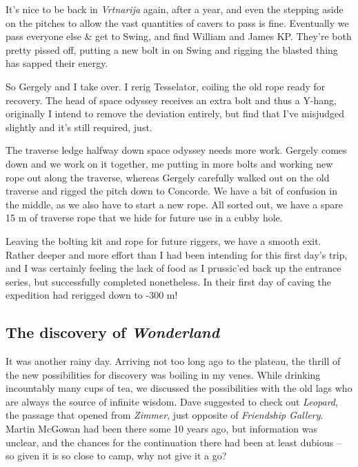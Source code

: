 It's nice to be back in \emph{Vrtnarija} again, after a year, and even
the stepping aside on the pitches to allow the vast quantities of cavers
to pass is fine. Eventually we pass everyone else \& get to Swing, and
find William and James KP. They're both pretty pissed off, putting a new
bolt in on Swing and rigging the blasted thing has sapped their energy.

So Gergely and I take over. I rerig Tesselator, coiling the old rope
ready for recovery. The head of space odyssey receives an extra bolt and
thus a Y-hang, originally I intend to remove the deviation entirely, but
find that I've misjudged slightly and it's still required, just.

The traverse ledge halfway down space odyssey needs more work. Gergely
comes down and we work on it together, me putting in more bolts and
working new rope out along the traverse, whereas Gergely carefully
walked out on the old traverse and rigged the pitch down to Concorde. We
have a bit of confusion in the middle, as we also have to start a new
rope. All sorted out, we have a spare 15 m of traverse rope that we hide
for future use in a cubby hole.

Leaving the bolting kit and rope for future riggers, we have a smooth
exit. Rather deeper and more effort than I had been intending for this
first day's trip, and I was certainly feeling the lack of food as I
prussic'ed back up the entrance series, but successfully completed
nonetheless. In their first day of caving the expedition had rerigged
down to -300 m!


\hypertarget{the-discovery-of-wonderland}{%
\subsection{\texorpdfstring{The discovery of
\emph{Wonderland}}{The discovery of Wonderland}}\label{the-discovery-of-wonderland}}

It was another rainy day. Arriving not too long ago to the plateau, the
thrill of the new possibilities for discovery was boiling in my venes.
While drinking incountably many cups of tea, we discussed the
possibilities with the old lags who are always the source of infinite
wisdom. Dave suggested to check out \emph{Leopard}, the passage that
opened from \emph{Zimmer}, just opposite of \emph{Friendship Gallery}.
Martin McGowan had been there some 10 years ago, but information was
unclear, and the chances for the continuation there had been at least
dubious -- so given it is so close to camp, why not give it a go?

